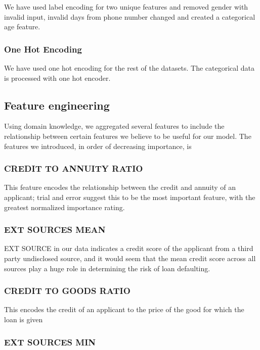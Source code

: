 \documentclass[sigconf, nonacm]{acmart}
\begin{document}
We have used label encoding for two unique features and removed gender with invalid input, invalid days from phone number changed and created a categorical age feature.

\subsubsection{One Hot Encoding}

We have used one hot encoding for the rest of the datasets. The categorical data is processed with one hot encoder.

\subsection{Feature engineering}

Using domain knowledge, we aggregated several features to include the relationship between certain features we believe to be useful for our model. The features we introduced, in order of decreasing importance, is

\subsubsection{CREDIT TO ANNUITY RATIO}

This feature encodes the relationship between the credit and annuity of an applicant; trial and error suggest this to be the most important feature, with the greatest normalized importance rating.

\subsubsection{EXT SOURCES MEAN}

EXT SOURCE in our data indicates a credit score of the applicant from a third party undisclosed source, and it would seem that the mean credit score across all sources play a huge role in determining the risk of loan defaulting.

\subsubsection{CREDIT TO GOODS RATIO}

This encodes the credit of an applicant to the price of the good for which the loan is given

\subsubsection{EXT SOURCES MIN}
\end{document}

